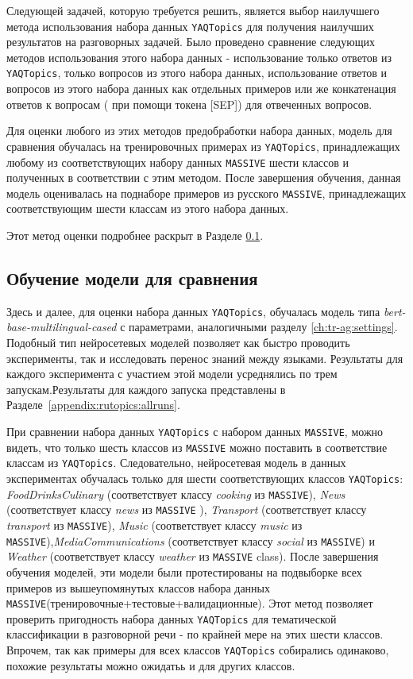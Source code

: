 Следующей задачей, которую требуется решить, является выбор наилучшего метода использования набора данных \texttt{YAQTopics} для получения наилучших результатов на разговорных задачей. Было проведено сравнение следующих методов использования этого набора данных - использование только ответов из \texttt{YAQTopics}, только вопросов из этого набора данных, использование ответов и вопросов из этого набора данных как отдельных примеров или же конкатенация ответов к вопросам ( при помощи токена [SEP]) для отвеченных вопросов.

Для оценки любого из этих методов предобработки набора данных, модель для сравнения обучалась на тренировочных примерах из \texttt{YAQTopics}, принадлежащих любому из соответствующих набору данных \texttt{MASSIVE} шести классов и полученных в соответствии с этим методом. После завершения обучения, данная модель оценивалась на поднаборе примеров из русского \texttt{MASSIVE}, принадлежащих соответствующим шести классам из этого набора данных.

Этот метод оценки подробнее раскрыт в Разделе \ref{comparison_model}.

\subsection{Обучение модели для сравнения}\label{comparison_model}
Здесь и далее, для оценки набора данных \texttt{YAQTopics}, обучалась модель типа \textit{bert-base-multilingual-cased} с параметрами, аналогичными разделу \ref{ch:tr-ag:settings}. Подобный тип нейросетевых моделей позволяет как быстро проводить эксперименты, так и исследовать перенос знаний между языками. Результаты для каждого эксперимента с участием этой модели усреднялись по трем запускам.Результаты для каждого запуска представлены в Разделе~\ref{appendix:rutopics:allruns}.

При сравнении набора данных \texttt{YAQTopics} с набором данных \texttt{MASSIVE}, можно видеть, что только шесть классов из \texttt{MASSIVE} можно поставить в соответствие классам из  \texttt{YAQTopics}. Следовательно, нейросетевая модель в данных экспериментах обучалась только для шести соответствующих классов \texttt{YAQTopics}: \textit{FoodDrinksCulinary} (соответствует классу \textit{cooking} из \texttt{MASSIVE}), \textit{News} (соответствует классу \textit{news} из \texttt{MASSIVE} ), \textit{Transport} (соответствует классу \textit{transport} из \texttt{MASSIVE}), \textit{Music} (соответствует классу \textit{music} из \texttt{MASSIVE}),\textit{MediaCommunications} (соответствует классу \textit{social} из \texttt{MASSIVE}) и \textit{Weather} (соответствует классу \textit{weather} из \texttt{MASSIVE} class). После завершения обучения моделей, эти модели были протестированы на подвыборке всех примеров из вышеупомянутых классов набора данных \texttt{MASSIVE}(тренировочные+тестовые+валидационные). Этот метод позволяет проверить пригодность набора данных \texttt{YAQTopics} для тематической классификации в разговорной речи - по крайней мере на этих шести классов. Впрочем, так как примеры для всех классов \texttt{YAQTopics} собирались одинаково, похожие результаты можно ожидатьь и для других классов.


